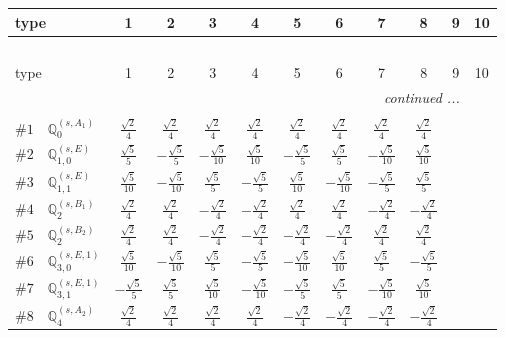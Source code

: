 \documentclass[fleqn,9pt,landscape]{jsarticle}
\begin{document}
\begin{center}
\renewcommand{\arraystretch}{1.3}
\begin{longtable}{lcccccccccc}
 \hline \hline
type & 1 & 2 & 3 & 4 & 5 & 6 & 7 & 8 & 9 & 10 \\ \hline \endfirsthead

\multicolumn{10}{l}{\tablename\ \thetable{}} \\
 \hline \hline
type & 1 & 2 & 3 & 4 & 5 & 6 & 7 & 8 & 9 & 10 \\ \hline \endhead

 \hline \hline
\multicolumn{10}{r}{\footnotesize\it continued ...} \\ \endfoot

 \hline \hline
\multicolumn{10}{r}{} \\ \endlastfoot

$ \#1\quad \mathbb{Q}_{0}^{(s,A_{1})} $ & $ \frac{\sqrt{2}}{4} $ & $ \frac{\sqrt{2}}{4} $ & $ \frac{\sqrt{2}}{4} $ & $ \frac{\sqrt{2}}{4} $ & $ \frac{\sqrt{2}}{4} $ & $ \frac{\sqrt{2}}{4} $ & $ \frac{\sqrt{2}}{4} $ & $ \frac{\sqrt{2}}{4} $ \\ \hline
$ \#2\quad \mathbb{Q}_{1,0}^{(s,E)} $ & $ \frac{\sqrt{5}}{5} $ & $ - \frac{\sqrt{5}}{5} $ & $ - \frac{\sqrt{5}}{10} $ & $ \frac{\sqrt{5}}{10} $ & $ - \frac{\sqrt{5}}{5} $ & $ \frac{\sqrt{5}}{5} $ & $ - \frac{\sqrt{5}}{10} $ & $ \frac{\sqrt{5}}{10} $ \\ \hline
$ \#3\quad \mathbb{Q}_{1,1}^{(s,E)} $ & $ \frac{\sqrt{5}}{10} $ & $ - \frac{\sqrt{5}}{10} $ & $ \frac{\sqrt{5}}{5} $ & $ - \frac{\sqrt{5}}{5} $ & $ \frac{\sqrt{5}}{10} $ & $ - \frac{\sqrt{5}}{10} $ & $ - \frac{\sqrt{5}}{5} $ & $ \frac{\sqrt{5}}{5} $ \\ \hline
$ \#4\quad \mathbb{Q}_{2}^{(s,B_{1})} $ & $ \frac{\sqrt{2}}{4} $ & $ \frac{\sqrt{2}}{4} $ & $ - \frac{\sqrt{2}}{4} $ & $ - \frac{\sqrt{2}}{4} $ & $ \frac{\sqrt{2}}{4} $ & $ \frac{\sqrt{2}}{4} $ & $ - \frac{\sqrt{2}}{4} $ & $ - \frac{\sqrt{2}}{4} $ \\ \hline
$ \#5\quad \mathbb{Q}_{2}^{(s,B_{2})} $ & $ \frac{\sqrt{2}}{4} $ & $ \frac{\sqrt{2}}{4} $ & $ - \frac{\sqrt{2}}{4} $ & $ - \frac{\sqrt{2}}{4} $ & $ - \frac{\sqrt{2}}{4} $ & $ - \frac{\sqrt{2}}{4} $ & $ \frac{\sqrt{2}}{4} $ & $ \frac{\sqrt{2}}{4} $ \\ \hline
$ \#6\quad \mathbb{Q}_{3,0}^{(s,E,1)} $ & $ \frac{\sqrt{5}}{10} $ & $ - \frac{\sqrt{5}}{10} $ & $ \frac{\sqrt{5}}{5} $ & $ - \frac{\sqrt{5}}{5} $ & $ - \frac{\sqrt{5}}{10} $ & $ \frac{\sqrt{5}}{10} $ & $ \frac{\sqrt{5}}{5} $ & $ - \frac{\sqrt{5}}{5} $ \\ \hline
$ \#7\quad \mathbb{Q}_{3,1}^{(s,E,1)} $ & $ - \frac{\sqrt{5}}{5} $ & $ \frac{\sqrt{5}}{5} $ & $ \frac{\sqrt{5}}{10} $ & $ - \frac{\sqrt{5}}{10} $ & $ - \frac{\sqrt{5}}{5} $ & $ \frac{\sqrt{5}}{5} $ & $ - \frac{\sqrt{5}}{10} $ & $ \frac{\sqrt{5}}{10} $ \\ \hline
$ \#8\quad \mathbb{Q}_{4}^{(s,A_{2})} $ & $ \frac{\sqrt{2}}{4} $ & $ \frac{\sqrt{2}}{4} $ & $ \frac{\sqrt{2}}{4} $ & $ \frac{\sqrt{2}}{4} $ & $ - \frac{\sqrt{2}}{4} $ & $ - \frac{\sqrt{2}}{4} $ & $ - \frac{\sqrt{2}}{4} $ & $ - \frac{\sqrt{2}}{4} $ \\
\end{longtable}
\end{center}
\end{document}
